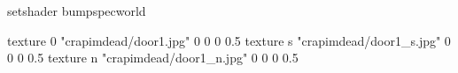 setshader bumpspecworld

texture 0 "crapimdead/door1.jpg" 0 0 0 0.5
texture s "crapimdead/door1_s.jpg" 0 0 0 0.5
texture n "crapimdead/door1_n.jpg" 0 0 0 0.5